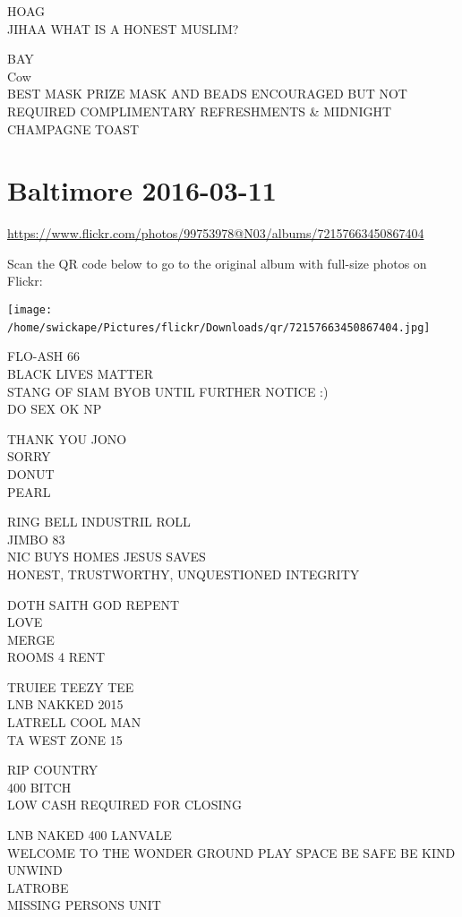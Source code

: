 \documentclass[10pt,letterpaper]{article}
\begin{document}
HOAG\\
JIHAA WHAT IS A HONEST MUSLIM?

BAY\\
Cow\\
BEST MASK PRIZE MASK AND BEADS ENCOURAGED BUT NOT REQUIRED COMPLIMENTARY REFRESHMENTS \& MIDNIGHT CHAMPAGNE TOAST
\

\section*{Baltimore 2016-03-11}

\url{https://www.flickr.com/photos/99753978@N03/albums/72157663450867404}

Scan the QR code below to go to the original album with full-size photos on Flickr:

\texttt{[image: /home/swickape/Pictures/flickr/Downloads/qr/72157663450867404.jpg]}
\

FLO{-}ASH 66\\
BLACK LIVES MATTER\\
STANG OF SIAM BYOB UNTIL FURTHER NOTICE :)\\
DO SEX OK NP

THANK YOU JONO\\
SORRY\\
DONUT\\
PEARL

RING BELL INDUSTRIL ROLL\\
JIMBO 83\\
NIC BUYS HOMES JESUS SAVES\\
HONEST, TRUSTWORTHY, UNQUESTIONED INTEGRITY

DOTH SAITH GOD REPENT\\
LOVE\\
MERGE\\
ROOMS 4 RENT

TRUIEE TEEZY TEE\\
LNB NAKKED 2015\\
LATRELL COOL MAN\\
TA WEST ZONE 15

RIP COUNTRY\\
400 BITCH\\
LOW CASH REQUIRED FOR CLOSING

LNB NAKED 400 LANVALE\\
WELCOME TO THE WONDER GROUND PLAY SPACE BE SAFE BE KIND UNWIND\\
LATROBE\\
MISSING PERSONS UNIT
\end{document}
